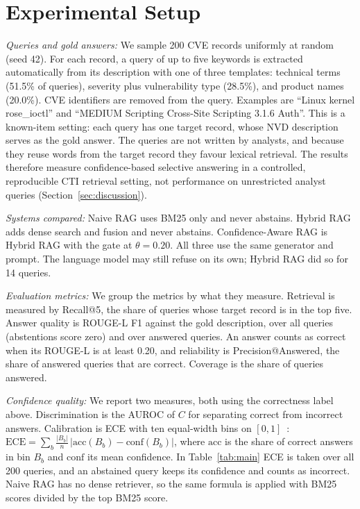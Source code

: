 \documentclass[conference]{IEEEtran}
\begin{document}
\section{Experimental Setup}
\label{sec:setup}
\noindent\textit{Queries and gold answers:} We sample 200 CVE records
uniformly at random (seed 42). For each record, a query of up to five
keywords is extracted automatically from its description with one of three
templates: technical terms (51.5\% of queries), severity plus
vulnerability type (28.5\%), and product names (20.0\%). CVE identifiers
are removed from the query. Examples are ``Linux kernel rose\_ioctl'' and
``MEDIUM Scripting Cross-Site Scripting 3.1.6 Auth''. This is a
known-item setting: each query has one target record, whose NVD
description serves as the gold answer. The queries are not written by
analysts, and because they reuse words from the target record they favour
lexical retrieval. The results therefore measure confidence-based
selective answering in a controlled, reproducible CTI retrieval setting,
not performance on unrestricted analyst queries
(Section~\ref{sec:discussion}).

\noindent\textit{Systems compared:} Naive RAG uses BM25 only and never
abstains. Hybrid RAG adds dense search and fusion and never abstains.
Confidence-Aware RAG is Hybrid RAG with the gate at $\theta=0.20$. All
three use the same generator and prompt. The language model may still
refuse on its own; Hybrid RAG did so for 14 queries.

\noindent\textit{Evaluation metrics:} We group the metrics by what they
measure. Retrieval is measured by Recall@5, the share of queries whose
target record is in the top five. Answer quality is ROUGE-L F1 against the
gold description, over all queries (abstentions score zero) and over
answered queries. An answer counts as correct when its ROUGE-L is at least
0.20, and reliability is Precision@Answered, the share of answered queries
that are correct. Coverage is the share of queries answered.

\noindent\textit{Confidence quality:} We report two measures, both using
the correctness label above. Discrimination is the AUROC of $C$ for
separating correct from incorrect answers. Calibration is ECE with ten
equal-width bins on $[0,1]$~\cite{ref_calibration}:
$\mathrm{ECE}=\sum_{b}\frac{|B_b|}{n}\,\lvert\mathrm{acc}(B_b)-\mathrm{conf}(B_b)\rvert$,
where $\mathrm{acc}$ is the share of correct answers in bin $B_b$ and
$\mathrm{conf}$ its mean confidence. In Table~\ref{tab:main} ECE is taken
over all 200 queries, and an abstained query keeps its confidence and
counts as incorrect. Naive RAG has no dense retriever, so the same formula
is applied with BM25 scores divided by the top BM25 score.
\end{document}
